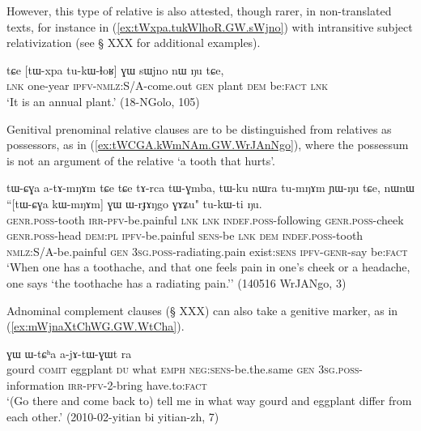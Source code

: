 However, this type of relative is also attested, though rarer, in non-translated texts, for instance in (\ref{ex:tWxpa.tukWlhoR.GW.sWjno}) with intransitive subject relativization (see § XXX for additional examples).

\begin{exe}
\ex \label{ex:tWxpa.tukWlhoR.GW.sWjno}
\gll  tɕe [tɯ-xpa tu-kɯ-ɬoʁ] ɣɯ sɯjno nɯ ŋu tɕe, \\
\textsc{lnk} one-year \textsc{ipfv}-\textsc{nmlz}:S/A-come.out \textsc{gen} plant \textsc{dem} be:\textsc{fact} \textsc{lnk} \\
\glt  `It is an annual plant.' (18-NGolo, 105)
\end{exe}

Genitival prenominal relative clauses are to be distinguished from relatives as possessors, as in (\ref{ex:tWCGA.kWmNAm.GW.WrJAnNgo}), where the possessum   is not an argument of the relative  `a tooth that hurts'. 

\begin{exe}
\ex \label{ex:tWCGA.kWmNAm.GW.WrJAnNgo}
\gll tɯ-ɕɣa a-tɤ-mŋɤm tɕe tɕe tɤ-rca tɯ-ɣmba, tɯ-ku nɯra tu-mŋɤm ɲɯ-ŋu tɕe,  nɯnɯ ``[tɯ-ɕɣa kɯ-mŋɤm] ɣɯ ɯ-rɟɤŋgo ɣɤʑu" tu-kɯ-ti ŋu. \\
\textsc{genr}.\textsc{poss}-tooth \textsc{irr}-\textsc{pfv}-be.painful \textsc{lnk} \textsc{lnk} \textsc{indef}.\textsc{poss}-following \textsc{genr}.\textsc{poss}-cheek \textsc{genr}.\textsc{poss}-head \textsc{dem}:\textsc{pl} \textsc{ipfv}-be.painful \textsc{sens}-be \textsc{lnk} \textsc{dem} \textsc{indef}.\textsc{poss}-tooth \textsc{nmlz}:S/A-be.painful \textsc{gen} \textsc{3sg}.\textsc{poss}-radiating.pain exist:\textsc{sens} \textsc{ipfv}-\textsc{genr}-say be:\textsc{fact} \\
\glt `When one has a toothache, and that one feels pain in one's cheek or a headache, one says `the toothache has a radiating pain.'' (140516 WrJANgo, 3)
\end{exe}

Adnominal complement clauses (§ XXX) can also take a genitive marker, as in (\ref{ex:mWjnaXtChWG.GW.WtCha}).

\begin{exe}
\ex \label{ex:mWjnaXtChWG.GW.WtCha}
 ɣɯ ɯ-tɕʰa a-jɤ-tɯ-ɣɯt ra \\
gourd \textsc{comit} eggplant \textsc{du} what \textsc{emph} \textsc{neg}:\textsc{sens}-be.the.same \textsc{gen} \textsc{3sg}.\textsc{poss}-information \textsc{irr}-\textsc{pfv}-2-bring have.to:\textsc{fact} \\
\glt `(Go there and come back to) tell me in what way gourd and eggplant differ from each other.' (2010-02-yitian bi yitian-zh, 7)
\end{exe}

